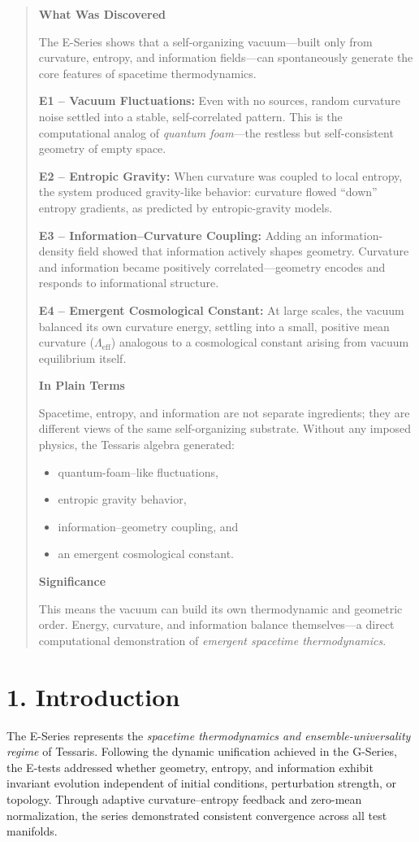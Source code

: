 \documentclass[12pt]{article}
\begin{document}
\begin{quote}
\textbf{What Was Discovered}

The E-Series shows that a self-organizing vacuum—built only from curvature, entropy, and information fields—can spontaneously generate the core features of spacetime thermodynamics.

\textbf{E1 – Vacuum Fluctuations:}
Even with no sources, random curvature noise settled into a stable, self-correlated pattern.
This is the computational analog of \emph{quantum foam}—the restless but self-consistent geometry of empty space.

\textbf{E2 – Entropic Gravity:}
When curvature was coupled to local entropy, the system produced gravity-like behavior:
curvature flowed “down” entropy gradients, as predicted by entropic-gravity models.

\textbf{E3 – Information–Curvature Coupling:}
Adding an information-density field showed that information actively shapes geometry.
Curvature and information became positively correlated—geometry encodes and responds to informational structure.

\textbf{E4 – Emergent Cosmological Constant:}
At large scales, the vacuum balanced its own curvature energy,
settling into a small, positive mean curvature ($\Lambda_{\mathrm{eff}}$) analogous to a cosmological constant arising from vacuum equilibrium itself.

\bigskip
\textbf{In Plain Terms}

Spacetime, entropy, and information are not separate ingredients; they are different views of the same self-organizing substrate.
Without any imposed physics, the Tessaris algebra generated:
\begin{itemize}
  \item quantum-foam–like fluctuations,
  \item entropic gravity behavior,
  \item information–geometry coupling, and
  \item an emergent cosmological constant.
\end{itemize}

\textbf{Significance}

This means the vacuum can build its own thermodynamic and geometric order.
Energy, curvature, and information balance themselves—a direct computational demonstration of \emph{emergent spacetime thermodynamics}.
\end{quote}

\section*{1. Introduction}
The E-Series represents the \emph{spacetime thermodynamics and ensemble-universality regime} of Tessaris.
Following the dynamic unification achieved in the G-Series, the E-tests addressed whether geometry, entropy, and information exhibit invariant evolution independent of initial conditions, perturbation strength, or topology.
Through adaptive curvature–entropy feedback and zero-mean normalization, the series demonstrated consistent convergence across all test manifolds.
\end{document}
